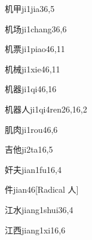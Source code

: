\begin{verbete}{机甲}{ji1jia3}{6,5}
\end{verbete}

\begin{verbete}{机场}{ji1chang3}{6,6}
\end{verbete}

\begin{verbete}{机票}{ji1piao4}{6,11}
\end{verbete}

\begin{verbete}{机械}{ji1xie4}{6,11}
\end{verbete}

\begin{verbete}{机器}{ji1qi4}{6,16}
\end{verbete}

\begin{verbete}{机器人}{ji1qi4ren2}{6,16,2}
\end{verbete}

\begin{verbete}{肌肉}{ji1rou4}{6,6}
\end{verbete}

\begin{verbete}{吉他}{ji2ta1}{6,5}
\end{verbete}

\begin{verbete}{奸夫}{jian1fu1}{6,4}
\end{verbete}

\begin{verbete}{件}{jian4}{6}[Radical 人]
\end{verbete}

\begin{verbete}{江水}{jiang1shui3}{6,4}
\end{verbete}

\begin{verbete}{江西}{jiang1xi1}{6,6}
\end{verbete}

